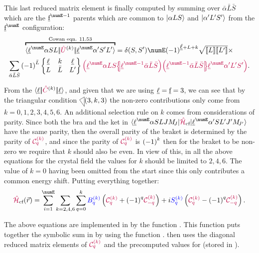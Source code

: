 \documentclass[11pt, twoside,openright]{article}
\begin{document}
    This last reduced matrix element is finally computed by summing over $\bar{\alpha}\bar{L}\bar{S}$ which are the $\forb^{\numE-1}$ parents which are common to $|\alpha L S\rangle$ and $|\alpha' L' S'\rangle$ from the $\forb^{\numE}$ configuration:
    \begin{multline}
    \overbracket{\redbraopket{\lorb^\numE \alpha S L} 
        {\op{U}^{(k)}}
        {\lorb^\numE \alpha' S' L'}}^{\text{Cowan eqn. 11.53}} = \kronecker{S}{S'} \numE \phaser{\lorb + L + k}
            \sqrt{\tpobraket{L}\tpobraket{L'}} \times \\
    \sum_{\bar{\alpha}\bar{L}\bar{S}} 
        \phaser{\bar{L}} \sixj{\lorb}{k}{\lorb}{L}{\bar{L}}{L'}
        \cfpinv{\lorb^\numE \alpha L S}
            {\lorb^{\numE - 1}\bar{\alpha}\bar{L}\bar{S}}
        \cfp{\lorb^{\numE -1}\bar{\alpha}\bar{L}\bar{S}}{\lorb^\numE\alpha'L'S'}.
    \label{eqn:ReducedUk}
    \end{multline}

    From the $\langle \underbar{$\ell$}|\!|\textcolor{purple}{\hat{C}}^{(k)}|\!|\underbar{$\ell$}\rangle$, and given that we are using $\underbar{$\ell$} = \underbar{\text{f}} = 3$, we can see that by the triangular condition $\tricondition{3,k,3}$ the non-zero contributions only come from $k=0,1,2,3,4,5,6$. An additional selection rule on $k$ comes from considerations of parity. Since both the bra and the ket in $\braopket{\lorb^\numE \alpha SLJ \Msub{J}}{\hamCrystalFieldSymbol}{\lorb^\numE \alpha'S L' J' \Msub{J'}}$ have the same parity, then the overall parity of the braket is determined by the parity of $\textcolor{purple}{\mathcal{C}^{(k)}_{q}}$, and since the parity of $\textcolor{purple}{\mathcal{C}^{(k)}_{q}}$ is ${(-1)}^{k}$ then for the braket to be non-zero we require that $k$ should also be even. In view of this, in all the above equations for the crystal field the values for $k$ should be limited to $2,4,6$. The value of $k=0$ having been omitted from the start since this only contributes a common energy shift. Putting everything together:
       	\begin{equation}
        \hamCrystalFieldSymbol(\vec{r}) = 
        	\sum_{i=1}^\numE
        	\sum_{k=2,4,6}
        	\sum_{q=0}^{k} \Bkq{k}{q} \left(\Ckq{k}{q} + \phaser{q}\Ckq{k}{-q}\right) + i \Skq{k}{q} \left(\Ckq{k}{q} - \phaser{q}\Ckq{k}{-q}\right).
    	\label{eqn:supreme crystal sum}
    	\end{equation}

    The above equations are implemented in \qlanth by the function . This function puts together the symbolic sum in  by using the function .  then uses the diagonal reduced matrix elements of $\textcolor{purple}{\mathcal{C}^{(k)}_{q}}$ and the precomputed values for  (stored in ).
\end{document}
